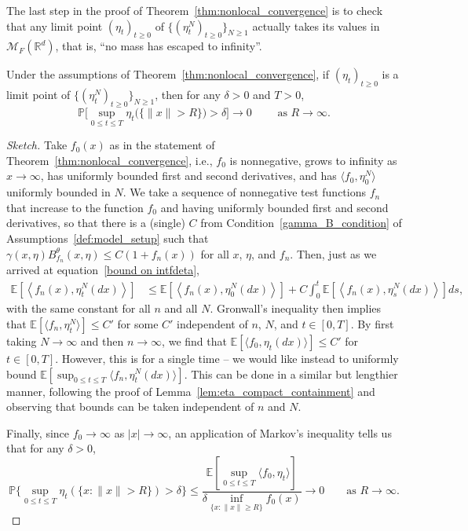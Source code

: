 \documentclass[EJP]{ejpecp} %
\newcommand{\IP}{\mathbb P}
\newcommand{\IE}{\mathbb E}
\newcommand{\IR}{\mathbb R}
\newcommand{\measures}{\mathcal{M}_F(\IR^d)} %
\begin{document}
The last step in the proof of Theorem~\ref{thm:nonlocal_convergence}
is to check that
any limit point $(\eta_t)_{t\geq 0}$ of $\{(\eta^N_t)_{t\geq 0}\}_{N\geq 1}$
actually takes its values in $\measures$, that is, ``no mass has escaped to infinity''.

\begin{lemma}
\label{no mass at infty}
Under the assumptions of Theorem~\ref{thm:nonlocal_convergence},
if $(\eta_t)_{t\geq 0}$ is a limit point of $\{(\eta^N_t)_{t\geq 0}\}_{N\geq 1}$,
then for any $\delta>0$ and $T>0$,
\[
\IP\bigg[
    \sup_{0 \le t \le T} \eta_t\big(\{\|x\|>R\}\big)>\delta
\bigg]\to 0\qquad\mbox{ as }R\to\infty.
\]
\end{lemma}

\begin{proof}[Sketch]
Take $f_0(x)$ as in the statement of Theorem~\ref{thm:nonlocal_convergence},
i.e., $f_0$ is nonnegative, grows to infinity as $x \to \infty$,
has uniformly bounded first and second derivatives,
and has $\langle f_0, \eta^N_0\rangle$ uniformly bounded in $N$.
We take a sequence of nonnegative test functions $f_n$ that increase to the function $f_0$
and having uniformly bounded first and second derivatives,
so that there is a (single) $C$
from Condition~\ref{gamma_B_condition} of Assumptions~\ref{def:model_setup}
such that $\gamma(x,\eta) B_{f_n}^\theta(x,\eta) \le C(1 + f_n(x))$
for all $x$, $\eta$, and $f_n$.
Then, just as we arrived at equation~\eqref{bound on intfdeta},
\begin{align*}
    \IE\left[\left\langle f_n(x), \eta^N_t(dx) \right\rangle\right]
    &\le
    \IE\left[\left\langle f_n(x), \eta^N_0(dx) \right\rangle\right]
    +
    C \int_0^t \IE\left[\left\langle f_n(x), \eta^N_s(dx) \right\rangle \right] ds ,
\end{align*}
with the same constant for all $n$ and all $N$.
Gronwall's inequality then implies that 
$\IE[\langle f_n, \eta^N_t\rangle] \le C'$
for some $C'$ independent of $n$, $N$, and $t \in [0,T]$.
By first taking $N \to \infty$ and then $n \to \infty$,
we find that $\IE[\langle f_0, \eta_t(dx)\rangle] \le C'$ for $t\in [0,T]$.
However, this is for a single time --
we would like instead to uniformly bound
$\IE[\sup_{0 \le t \le T} \langle f_n, \eta^N_t(dx)\rangle]$.
This can be done in a similar but lengthier manner,
following the proof of Lemma~\ref{lem:eta_compact_containment}
and observing that bounds can be taken independent of $n$ and $N$.

Finally, since $f_0 \to \infty$ as $|x| \to \infty$,
an application of Markov's inequality
tells us that for any $\delta > 0$,
$$
    \IP\bigg\{ \sup_{0 \le t \le T} \eta_t(\{x : \|x\| > R\})>\delta \bigg\}
    \le \frac{\IE[\sup_{0 \le t \le T} \langle f_0, \eta_t\rangle]}{\delta \inf_{\{x:\|x\|\ge R\}} f_0(x)}
    \to 0 \qquad \text{as } R\to\infty .
$$
\end{proof}
\end{document}
